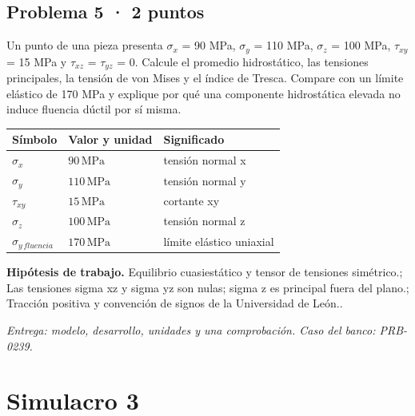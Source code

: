 \par\medskip\noindent\begin{minipage}{\linewidth}

\section{Problema 5 · 2 puntos}

Un punto de una pieza presenta $\sigma_x$ = 90 MPa, $\sigma_y$ = 110 MPa, $\sigma_z$ = 100 MPa, $\tau_{xy}$ = 15 MPa y $\tau_{xz}$ = $\tau_{yz}$ = 0. Calcule el promedio hidrostático, las tensiones principales, la tensión de von Mises y el índice de Tresca. Compare con un límite elástico de 170 MPa y explique por qué una componente hidrostática elevada no induce fluencia dúctil por sí misma.

\par\medskip\noindent\begin{tabular}{@{}p{.18\linewidth}p{.26\linewidth}p{.48\linewidth}@{}}
\toprule Símbolo & Valor y unidad & Significado\\\midrule
$\sigma_{x}$ & $90\,\mathrm{MPa}$ & tensión normal x\\
$\sigma_{y}$ & $110\,\mathrm{MPa}$ & tensión normal y\\
$\tau_{xy}$ & $15\,\mathrm{MPa}$ & cortante xy\\
$\sigma_{z}$ & $100\,\mathrm{MPa}$ & tensión normal z\\
$\sigma_{y\,fluencia}$ & $170\,\mathrm{MPa}$ & límite elástico uniaxial\\
\bottomrule\end{tabular}\par\medskip



\par\textbf{Hipótesis de trabajo.} Equilibrio cuasiestático y tensor de tensiones simétrico.; Las tensiones sigma xz y sigma yz son nulas; sigma z es principal fuera del plano.; Tracción positiva y convención de signos de la Universidad de León..

\par\textit{Entrega: modelo, desarrollo, unidades y una comprobación. Caso del banco: PRB-0239.}\end{minipage}\par\medskip


\chapter{Simulacro 3}

